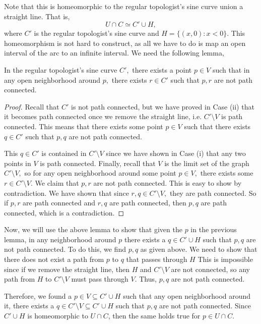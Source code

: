 \documentclass{article}
\numberwithin{equation}{section}
\begin{document}
\begin{enumerate}
    Note that this is homeomorphic to the regular topologist's sine curve union a straight line. That is,
    \begin{equation}
        U \cap C \simeq C' \cup H,
    \end{equation}
    where $C'$ is the regular topologist's sine curve and $H=\{(x,0): x<0\}$. This homeomorphism is not hard to construct, as all we have to do is map an open interval of the arc to an infinite interval. We need the following lemma, 
    \begin{lemma}
        In the regular topologist's sine curve $C',$ there exists a point $p\in V$ such that in any open neighborhood around $p,$ there exists $r\in C'$ such that $p,r$ are not path connected.
        \begin{proof}
            Recall that $C'$ is not path connected, but we have proved in Case (ii) that it becomes path connected once we remove the straight line, i.e. $C' \setminus V$ is path connected. This means that there exists some point $p\in V$ such that there exists $q \in C'$ such that $p,q$ are not path connected.
            \vspace{2mm}

            This $q\in C'$ is contained in $C' \setminus V$ since we have shown in Case (i) that any two points in $V$ is path connected. Finally, recall that $V$ is the limit set of the graph $C' \setminus V,$ so for any open neighborhood around some point $p\in V,$ there exists some $r\in C' \setminus V.$ We claim that $p,r$ are not path connected. This is easy to show by contradiction. We have shown that since $r,q\in C'\setminus V,$ they are path connected. So if $p,r$ are path connected and $r,q$ are path connected, then $p,q$ are path connected, which is a contradiction. 
        \end{proof}
    \end{lemma}
    Now, we will use the above lemma to show that given the $p$ in the previous lemma, in any neighborhood around $p$ there exists a $q \in C' \cup H$ such that $p,q$ are not path connected. To do this, we find $p,q$ as given above. We need to show that there does not exist a path from $p$ to $q$ that passes through $H$ This is impossible since if we remove the straight line, then $H$ and $C' \setminus V$ are not connected, so any path from $H$ to $C' \setminus V$ must pass through $V.$ Thus, $p,q$ are not path connected.

    Therefore, we found a $p\in V \subseteq C' \cup H$ such that any open neighborhood around it, there exists a $q\in C'\setminus V \subseteq C'\cup H$ such that $p,q$ are not path connected. Since $C'\cup H$ is homeomorphic to $U\cap C$, then the same holds true for $p \in U\cap C.$
    

\end{enumerate}
\end{document}
